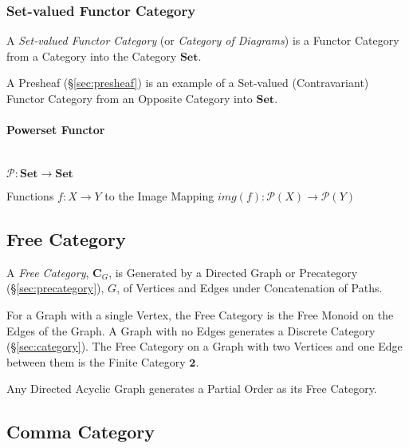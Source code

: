 \subsubsection{Set-valued Functor Category}\label{sec:setvalued_functor}

A \emph{Set-valued Functor Category} (or \emph{Category of Diagrams})
is a Functor Category from a Category into the Category
$\mathbf{Set}$.

A Presheaf (\S\ref{sec:presheaf}) is an example of a Set-valued
(Contravariant) Functor Category from an Opposite Category into
$\mathbf{Set}$.



\paragraph{Powerset Functor}\label{sec:powerset_functor}
\hfill \\

$\mathcal{P} : \mathbf{Set} \rightarrow \mathbf{Set}$

Functions $f : X \rightarrow Y$ to the Image Mapping $img(f) :
\mathcal{P}(X) \rightarrow \mathcal{P}(Y)$



\subsection{Free Category}\label{sec:free_category}

A \emph{Free Category}, $\mathbf{C}_G$, is Generated by a Directed
Graph or Precategory (\S\ref{sec:precategory}), $G$, of Vertices
and Edges under Concatenation of Paths.

For a Graph with a single Vertex, the Free Category is the Free Monoid
on the Edges of the Graph. A Graph with no Edges generates a Discrete
Category (\S\ref{sec:category}). The Free Category on a Graph with
two Vertices and one Edge between them is the Finite Category
$\mathbf{2}$.

Any Directed Acyclic Graph generates a Partial Order as its Free
Category.



\subsection{Comma Category}\label{sec:comma_category}

